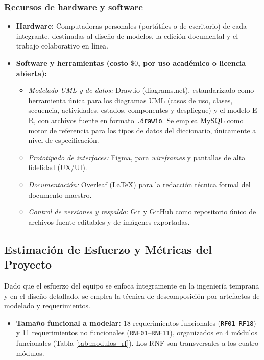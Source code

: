 \subsubsection{Recursos de hardware y software}

\begin{itemize}
    \item \textbf{Hardware:} Computadoras personales (portátiles o de escritorio) de cada integrante, destinadas al diseño de modelos, la edición documental y el trabajo colaborativo en línea.
    \item \textbf{Software y herramientas (costo $\$0$, por uso académico o licencia abierta):}
    \begin{itemize}
        \item \textit{Modelado UML y de datos:} Draw.io (diagrams.net), estandarizado como herramienta única para los diagramas UML (casos de uso, clases, secuencia, actividades, estados, componentes y despliegue) y el modelo E-R, con archivos fuente en formato \texttt{.drawio}. Se emplea MySQL como motor de referencia para los tipos de datos del diccionario, únicamente a nivel de especificación.
        \item \textit{Prototipado de interfaces:} Figma, para \textit{wireframes} y pantallas de alta fidelidad (UX/UI).
        \item \textit{Documentación:} Overleaf (LaTeX) para la redacción técnica formal del documento maestro.
        \item \textit{Control de versiones y respaldo:} Git y GitHub como repositorio único de archivos fuente editables y de imágenes exportadas.
    \end{itemize}
\end{itemize}

\subsection{Estimación de Esfuerzo y Métricas del Proyecto}
\label{subsec:esfuerzo_metricas}

Dado que el esfuerzo del equipo se enfoca íntegramente en la ingeniería temprana y en el diseño detallado, se emplea la técnica de descomposición por artefactos de modelado y requerimientos.

\begin{itemize}
    \item \textbf{Tamaño funcional a modelar:} 18 requerimientos funcionales (\texttt{RF01}--\texttt{RF18}) y 11 requerimientos no funcionales (\texttt{RNF01}--\texttt{RNF11}), organizados en 4 módulos funcionales (Tabla \ref{tab:modulos_rf}). Los RNF son transversales a los cuatro módulos.
\end{itemize}

